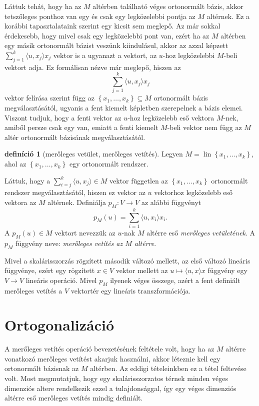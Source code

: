 \documentclass[a4paper, showtrims]{memoir}
\theoremstyle{plain}
\theoremstyle{remark}
\theoremstyle{definition}
\newtheorem{definition}[proposition]{definíció}
\DeclareMathOperator{\lin}{lin}
\newcommand{\ip}[2]{\langle#1,#2\rangle}
\begin{document}
Láttuk tehát, hogy ha az $M$ altérben található véges ortonormált bázis,
akkor tetszőleges ponthoz van egy és csak egy legközelebbi pontja az $M$ altérnek.
Ez a korábbi tapasztalataink szerint egy kicsit sem meglepő.
Az már sokkal érdekesebb, hogy mivel csak egy legközelebbi pont van, ezért
ha az $M$ altérben egy másik ortonormált bázist veszünk kiindulásul, akkor az azzal képzett
$\sum_{j=1}^k\ip{u}{x_j}x_j$ vektor is a ugyanazt a vektort, az $u$-hoz legközelebbi $M$-beli vektort adja.
Ez formálisan nézve már meglepő, hiszen az
\[
	\sum_{j=1}^k\ip{u}{x_j}x_j
\]
vektor felírása szerint függ az $\left\{ x_1,\ldots,x_k \right\}\subseteq M$ ortonormált bázis megválasztásától,
ugyanis a fent kiemelt képletben szerepelnek a bázis elemei.
Viszont tudjuk, hogy a fenti vektor az $u$-hoz legközelebb eső vektora $M$-nek, amiből persze csak egy van,
emiatt a fenti kiemelt $M$-beli vektor nem függ az $M$ altér ortonormált bázisának megválasztásától.
\begin{definition}[merőleges vetület, merőleges vetítés]
	Legyen $M=\lin\left\{ x_1,\ldots,x_k \right\}$,
	ahol az $\left\{ x_1,\ldots,x_k \right\}$ egy ortonormált rendszer.

	Láttuk, hogy a
	$\sum_{i=j}^k\ip{u}{x_j}\in M$ vektor független
	az $\left\{ x_1,\ldots,x_k \right\}$ ortonormált rendszer megválasztásától,
	hiszen ez vektor az $u$ vektorhoz legközelebb eső vektora az $M$ altérnek.
	Definiálja $p_M:V\to V$ az alábbi függvényt
	\[
		p_M\left( u \right)=
		\sum_{i=1}^k\ip{u}{x_i}x_i.
	\]
	A $p_M\left( u \right)\in M$ vektort nevezzük az $u$-nak $M$ altérre eső \emph{merőleges vetületének}.
	A $p_M$ függvény neve: \emph{merőleges vetítés az $M$ altérre}.
\end{definition}
Mivel a skalárisszorzás rögzített második változó mellett,
az első változó lineáris függvénye,
ezért egy rögzített $x\in V$ vektor mellett az $u\mapsto\ip{u}{x}x$ függvény egy $V\to V$ lineáris operáció.
Mivel $p_M$ ilyenek véges összege, azért a fent definiált merőleges vetítés a $V$ vektortér egy lineáris transzformációja.
\section{Ortogonalizáció}
A merőleges vetítés operáció bevezetésének feltétele volt, hogy ha az $M$ altérre vonatkozó
merőleges vetítést akarjuk használni, akkor léteznie kell egy ortonormált bázisnak az $M$ altérben.
Az eddigi tételeinkben ez a tétel feltevése volt.
Most megmutatjuk, hogy egy skalárisszorzatos térnek minden véges dimenziós altere rendelkezik ezzel a
tulajdonsággal, így egy véges dimenziós altérre eső merőleges vetítés mindig definiált.
\end{document}
